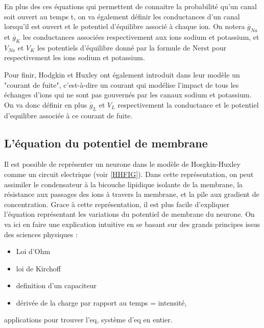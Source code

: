 \documentclass[12pt]{scrartcl}
\begin{document}
En plus des ces équations qui permettent de connaitre la probabilité qu'un canal soit ouvert au temps t, on va également définir les conductances d'un canal lorsqu'il est ouvert et le potentiel d'équilibre associé à chaque ion. On notera $\overline{g}_{Na}$ et $\overline{g}_K$ les conductances associées respectivement aux ions sodium et potassium, et $V_{Na}$ et $V_K$ les potentiels d'équilibre donné par la formule de Nerst pour respectivement les ions sodium et potassium.

Pour finir, Hodgkin et Huxley ont également introduit dans leur modèle un "courant de fuite", c'est-à-dire un courant qui modélise l'impact de tous les échanges d'ions qui ne sont pas gouvernés par les canaux sodium et potassium. On va donc définir en plus $\overline{g}_L$ et $V_L$ respectivement la conductance et le potentiel d'equilibre associée à ce courant de fuite.

\pagebreak
	\subsection{L'équation du potentiel de membrane}
Il est possible de représenter un neurone dans le modèle de Hosgkin-Huxley comme un circuit electrique (voir \ref{HHFIG}). Dans cette représentation, on peut assimiler le condensateur à la bicouche lipidique isolante de la membrane, la résistance aux passages des ions à travers la membrane, et la pile aux gradient de concentration. Grace à cette représentation, il est plus facile d'expliquer l'équation représentant les variations du potentiel de membrane du neurone. On va ici en faire une explication intuitive en se basant sur des grands principes issus des sciences physiques :
\begin{itemize}
\item Loi d'Ohm 
\item loi de Kirchoff
\item definition d'un capaciteur 
\item dérivée de la charge par rapport au temps = intensité, 
\end{itemize}
applications pour trouver l'eq, système d'eq en entier.
\end{document}
